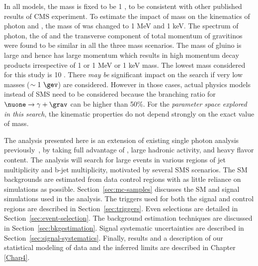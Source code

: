 In all models, the mass \grav is fixed to be 1 \gev, to be consistent with other published results of CMS experiment. 
To estimate the impact of \grav mass on the kinematics of photon and \grav, the mass of \grav was changed to 1 MeV and 1 keV. The \pt
spectrum of photon, the \pt of \grav and the transverse component of total momentum of gravitinos were found to be similar in all the
three \grav mass scenarios. The mass of gluino is large and hence \nuone has large momentum which 
results in high momentum decay products irrespective of 1 \gev or 1 MeV or 1 keV \grav mass.
The lowest \nuone mass considered for this study is 10 \gev. There \textit{may be} significant impact on the search if very low \nuone 
masses ($\sim 1\ \gev$) are considered. However in those cases, actual physics models instead of SMS need to be considered because the
branching ratio for $\nuone \to \gamma+\grav$ can be higher than 50\%. For the \textit{parameter
space explored in this search}, the kinematic properties do not depend strongly on the exact value of \grav mass.

The analysis presented here \cite{Sirunyan:2019hzr} is an extension of existing single photon analysis previously~\cite{Sirunyan:2017yse}, by taking full advantage
of \ptmiss, large hadronic activity, and heavy flavor content.  The analysis will search for large \ptmiss events
in various regions of jet multiplicity and b-jet multiplicity, motivated by several SMS scenarios.  The 
SM backgrounds are estimated from data control regions with as little reliance on simulations as possible.
Section~\ref{sec:mc-samples} discusses the SM and signal simulations used in the analysis.
The triggers used for both the signal and control regions are described in Section~\ref{sec:triggers}.   
Even selections are detailed in Section~\ref{sec:event-selection}. The background 
estimation techniques are discussed in Section~\ref{sec:bkgestimation}.  Signal systematic uncertainties are described in Section~\ref{sec:signal-systematics}.
Finally, results and a description of our statistical modeling of data and the inferred limits are described 
in Chapter \ref{Chap4}.

